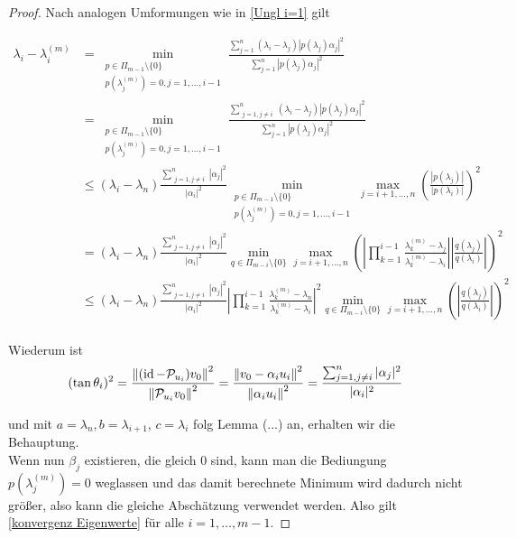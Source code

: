 \documentclass{article}
\begin{document}
\begin{theorem}
\begin{proof}
	Nach analogen Umformungen wie in \ref{Ungl i=1} gilt

	\begin{equation*}
		\begin{aligned}
			\lambda_i - \lambda_i^{(m)} &= \min_{\substack{p\in \Pi_{m-1}\setminus \{0\} \\ p(\lambda_j^{(m)}) = 0, j = 1,\dots,i-1}} \frac{\sum_{j=1}^{n} (\lambda_i - \lambda_j)|p(\lambda_j)\alpha_j|^2}{\sum_{j=1}^{n} |p(\lambda_j)\alpha_j|^2} \\
			&= \min_{\substack{p\in \Pi_{m-1}\setminus \{0\} \\ p(\lambda_j^{(m)}) = 0, j = 1,\dots,i-1}} \frac{\sum_{\substack{j=1, j\neq i}}^{n} (\lambda_i - \lambda_j)|p(\lambda_j)\alpha_j|^2}{\sum_{j=1}^{n} |p(\lambda_j)\alpha_j|^2} \\
			& \le (\lambda_i - \lambda_n) \frac{\sum_{\substack{j=1, j\neq i}}^{n} |\alpha_j|^2}{|\alpha_i|^2} \min_{\substack{p\in \Pi_{m-1}\setminus \{0\} \\ p(\lambda_j^{(m)}) = 0, j = 1,\dots,i-1}} \max_{j=i+1,\dots,n} \left(\frac{|p(\lambda_j)|}{|p(\lambda_i)|}\right)^2 \\
			&= (\lambda_i - \lambda_n) \frac{\sum_{\substack{j=1, j\neq i}}^{n} |\alpha_j|^2}{|\alpha_i|^2} \min_{q\in \Pi_{m-i}\setminus \{0\}} \max_{j=i+1,\dots,n} \left(\left|\prod_{k = 1}^{i-1} \frac{\lambda_k^{(m)} -\lambda_j}{\lambda_k^{(m)} - \lambda_i}\right| \left|\frac{q(\lambda_j)}{q(\lambda_i)}\right|\right)^2 \\
			&\le (\lambda_i - \lambda_n) \frac{\sum_{\substack{j=1, j\neq i}}^{n} |\alpha_j|^2}{|\alpha_i|^2} \left|\prod_{k = 1}^{i-1} \frac{\lambda_k^{(m)} -\lambda_n}{\lambda_k^{(m)} - \lambda_i}\right|^2 \min_{q\in \Pi_{m-i}\setminus \{0\}} \max_{j=i+1,\dots,n} \left(\left|\frac{q(\lambda_j)}{q(\lambda_i)}\right|\right)^2 \\
		\end{aligned}
	\end{equation*}
	
	Wiederum ist
	\begin{equation*}
		(\tan\theta_i)^2 = \frac{{\left \| (\operatorname{id} - \mathcal{P}_{u_i})v_0 \right \|}_{}^2}{{\left \|  \mathcal{P}_{u_i}v_0 \right \|}_{}^2} = \frac{{\left \| v_0 - \alpha_i u_i \right \|}_{}^2}{{\left \| \alpha_i u_i \right \|}_{}^2} = \frac{\sum_{\substack{j=1, j\neq i}}^{n} |\alpha_j|^2}{|\alpha_i|^2}
	\end{equation*}
	
	und  mit $a = \lambda_n, b= \lambda_{i+1}$, $c = \lambda_i$ folg Lemma (...) an, erhalten wir die Behauptung.\\
	
	Wenn nun $\beta_j$ existieren, die gleich 0 sind, kann man die Bediungung $p(\lambda_j^{(m)}) = 0$ weglassen und das damit berechnete Minimum wird dadurch nicht größer, also kann die gleiche Abschätzung verwendet werden.
	Also gilt \ref{konvergenz Eigenwerte} für alle $i = 1, \dots, m-1$.
	\end{proof}
\end{theorem}
\end{document}
